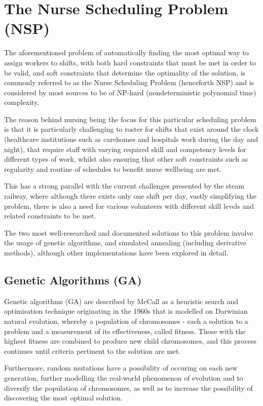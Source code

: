 \section{The Nurse Scheduling Problem (NSP)}
The aforementioned problem of automatically finding the most optimal way to assign workers to shifts, with both hard constraints that must be met in order to be valid, and soft constraints that determine the optimality of the solution, is commonly referred to as the Nurse Scheduling Problem (henceforth NSP) and is considered by most sources to be of NP-hard (nondeterministic polynomial time) complexity. \cite{Tassopoulos2013} 

The reason behind nursing being the focus for this particular scheduling problem is that it is particularly challenging to roster for shifts that exist around the clock (healthcare institutions such as carehomes and hospitals work during the day and night), that require staff with varying required skill and competency levels for different types of work, whilst also ensuring that other soft constraints such as regularity and routine of schedules to benefit nurse wellbeing are met. \cite{Burke2004}

This has a strong parallel with the current challenges presented by the steam railway, where although there exists only one shift per day, vastly simplifying the problem, there is also a need for various volunteers with different skill levels and related constraints to be met.

The two most well-researched and documented solutions to this problem involve the usage of genetic algorithms, and simulated annealing (including derivative methods), although other implementations have been explored in detail.

\subsection{Genetic Algorithms (GA)}
Genetic algorithms (GA) are described by McCall as a heuristic search and optimisation technique originating in the 1960s that is modelled on Darwinian natural evolution, whereby a population of chromosomes - each a solution to a problem and a measurement of its effectiveness, called fitness. Those with the highest fitness are combined to produce new child chromosomes, and this process continues until criteria pertinent to the solution are met. \cite{MCCALL2005205}

Furthermore, random mutations have a possibility of occuring on each new generation, further modelling the real-world phenomenon of evolution and to diversify the population of chromosomes, as well as to increase the possibility of discovering the most optimal solution. \cite{AUGUSTINE2009}

